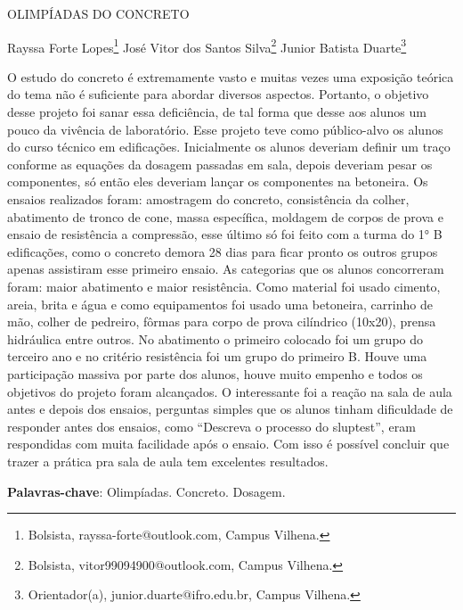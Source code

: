 \documentclass[article,12pt,onesidea,4paper,english,brazil]{abntex2}
\begin{document}
	
	
	\frenchspacing 
	
	\begin{center}
		\LARGE OLIMPÍADAS DO CONCRETO
		
		\normalsize
	Rayssa Forte Lopes\footnote{Bolsista, rayssa-forte@outlook.com, Campus Vilhena.} 
	José Vitor dos Santos Silva\footnote{Bolsista, vitor99094900@outlook.com, Campus Vilhena.} 
	Junior Batista Duarte\footnote{Orientador(a), junior.duarte@ifro.edu.br, Campus Vilhena.} 
	\end{center}
	
	\noindent O estudo do concreto é extremamente vasto e muitas vezes uma exposição teórica
	do tema não é suficiente para abordar diversos aspectos. Portanto, o objetivo desse
	projeto foi sanar essa deficiência, de tal forma que desse aos alunos um pouco da
	vivência de laboratório. Esse projeto teve como público-alvo os alunos do curso
	técnico em edificações. Inicialmente os alunos deveriam definir um traço conforme
	as equações da dosagem passadas em sala, depois deveriam pesar os
	componentes, só então eles deveriam lançar os componentes na betoneira. Os
	ensaios realizados foram: amostragem do concreto, consistência da colher,
	abatimento de tronco de cone, massa específica, moldagem de corpos de prova e
	ensaio de resistência a compressão, esse último só foi feito com a turma do 1° B
	edificações, como o concreto demora 28 dias para ficar pronto os outros grupos
	apenas assistiram esse primeiro ensaio. As categorias que os alunos concorreram
	foram: maior abatimento e maior resistência. Como material foi usado cimento, areia,
	brita e água e como equipamentos foi usado uma betoneira, carrinho de mão, colher
	de pedreiro, fôrmas para corpo de prova cilíndrico (10x20), prensa hidráulica entre
	outros. No abatimento o primeiro colocado foi um grupo do terceiro ano e no critério
	resistência foi um grupo do primeiro B. Houve uma participação massiva por parte
	dos alunos, houve muito empenho e todos os objetivos do projeto foram alcançados.
	O interessante foi a reação na sala de aula antes e depois dos ensaios, perguntas
	simples que os alunos tinham dificuldade de responder antes dos ensaios, como
	“Descreva o processo do sluptest”, eram respondidas com muita facilidade após o
	ensaio. Com isso é possível concluir que trazer a prática pra sala de aula tem
	excelentes resultados.
	
	\vspace{\onelineskip}
	
	\noindent
	\textbf{Palavras-chave}: Olimpíadas. Concreto. Dosagem.
	
\end{document}
